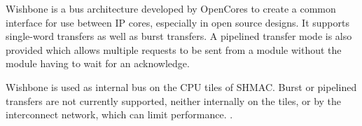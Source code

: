 Wishbone is a bus architecture developed by OpenCores to create a common interface for use between IP cores, especially in
open source designs. It supports single-word transfers as well as burst transfers. A pipelined transfer mode is also provided
which allows multiple requests to be sent from a module without the module having to wait for an acknowledge.

Wishbone is used as internal bus on the CPU tiles of SHMAC. Burst or pipelined transfers are
not currently supported, neither internally on the tiles, or by the interconnect network, which can limit performance. \cite{Yaman}.

%
